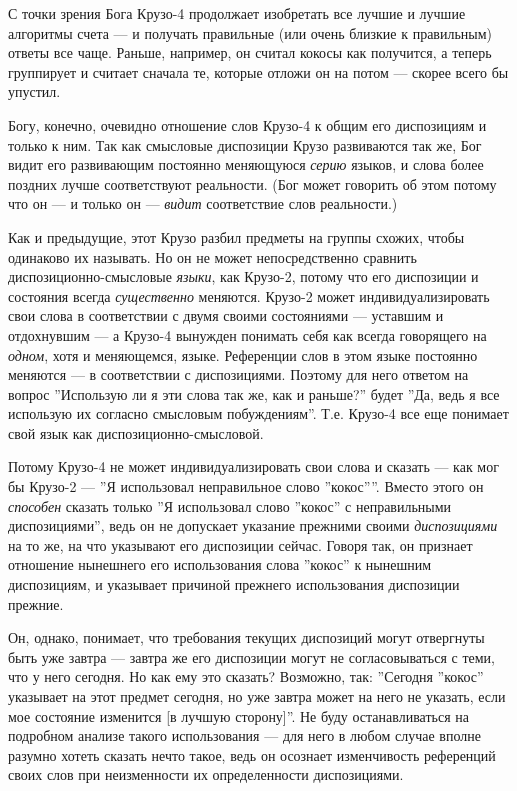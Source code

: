 \documentclass[11pt]{book}
\begin{document}
С точки зрения Бога Крузо-4 продолжает изобретать все лучшие и лучшие алгоритмы счета --- и получать правильные (или очень близкие к правильным) ответы все чаще. Раньше, например, он считал кокосы как получится, а теперь группирует и считает сначала те, которые отложи он на потом --- скорее всего бы упустил.

Богу, конечно, очевидно отношение слов Крузо-4 к общим его диспозициям и только к ним. Так как смысловые диспозиции Крузо развиваются так же, Бог видит его развивающим постоянно меняющуюся \textit{серию} языков, и слова более поздних лучше соответствуют реальности. (Бог может говорить об этом потому что он --- и только он --- \textit{видит} соответствие слов реальности.)

Как и предыдущие, этот Крузо разбил предметы на группы схожих, чтобы одинаково их называть. Но он не может непосредственно сравнить диспозиционно-смысловые \textit{языки}, как Крузо-2, потому что его диспозиции и состояния всегда \textit{существенно} меняются. Крузо-2 может индивидуализировать свои слова в соответствии с двумя своими состояниями --- уставшим и отдохнувшим --- а Крузо-4 вынужден понимать себя как всегда говорящего на \textit{одном}, хотя и меняющемся, языке. Референции слов в этом языке постоянно меняются --- в соответствии с диспозициями. Поэтому для него ответом на вопрос ''Использую ли я эти слова так же, как и раньше?'' будет ''Да, ведь я все использую их согласно смысловым побуждениям''. Т.е. Крузо-4 все еще понимает свой язык как диспозиционно-смысловой.

Потому Крузо-4 не может индивидуализировать свои слова и сказать --- как мог бы Крузо-2 --- ''Я использовал неправильное слово ''кокос''''. Вместо этого он \textit{способен} сказать только ''Я использовал слово ''кокос'' с неправильными диспозициями'', ведь он не допускает указание прежними своими \textit{диспозициями} на то же, на что указывают его диспозиции сейчас. Говоря так, он признает отношение нынешнего его использования слова ''кокос'' к нынешним диспозициям, и указывает причиной прежнего использования диспозиции прежние.

Он, однако, понимает, что требования текущих диспозиций могут отвергнуты быть уже завтра --- завтра же его диспозиции могут не согласовываться с теми, что у него сегодня. Но как ему это сказать? Возможно, так: ''Сегодня ''кокос'' указывает на этот предмет сегодня, но уже завтра может на него не указать, если мое состояние изменится [в лучшую сторону]''. Не буду останавливаться на подробном анализе такого использования --- для него в любом случае вполне разумно хотеть сказать нечто такое, ведь он осознает изменчивость референций своих слов при неизменности их определенности диспозициями.
\end{document}
